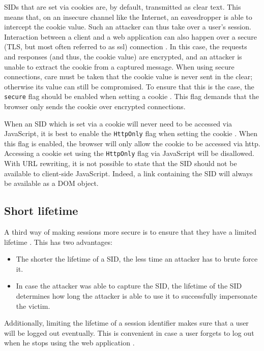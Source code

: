 \label{secure-flag}SIDs that are set via cookies are, by default, transmitted as clear text. This means that, on an insecure channel like the Internet, an eavesdropper is able to intercept the cookie value. Such an attacker can thus take over a user's session. Interaction between a client and a web application can also happen over a secure (TLS, but most often referred to as \gls{ssl}) connection \cite{Stallings2011,rfc4346}. In this case, the requests and responses (and thus, the cookie value) are encrypted, and an attacker is unable to extract the cookie from a captured message. When using secure connections, care must be taken that the cookie value is never sent in the clear; otherwise its value can still be compromised. To ensure that this is the case, the \texttt{secure} flag should be enabled when setting a cookie \cite{Fu2001, rfc2109}. This flag demands that the browser only sends the cookie over encrypted connections.

When an SID which is set via a cookie will never need to be accessed via JavaScript, it is best to enable the \texttt{HttpOnly} flag when setting the cookie \cite{Nikiforakis2010}. When this flag is enabled, the browser will only allow the cookie to be accessed via \gls{http}. Accessing a cookie set using the \texttt{HttpOnly} flag via JavaScript will be disallowed. With URL rewriting, it is not possible to state that the SID should not be available to client-side JavaScript. Indeed, a link containing the SID will always be available as a DOM object.

\subsection{Short lifetime}\label{lifetime}
A third way of making sessions more secure is to ensure that they have a limited lifetime \cite{Fu2001}. This has two advantages:
\begin{itemize}
	\item The shorter the lifetime of a SID, the less time an attacker has to brute force it.
	\item In case the attacker was able to capture the SID, the lifetime of the SID determines how long the attacker is able to use it to successfully impersonate the victim.
\end{itemize}

Additionally, limiting the lifetime of a session identifier makes sure that a user will be logged out eventually. This is convenient in case a user forgets to log out when he stops using the web application \cite{OWASP2009a}.

